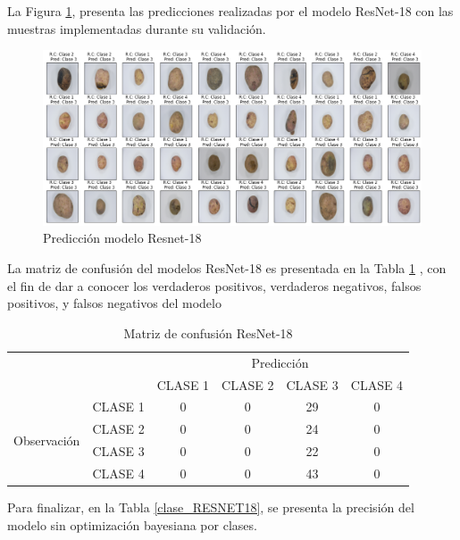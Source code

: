 \newpage
La Figura \ref{fig:pre_RESNET18}, presenta las predicciones realizadas por el modelo ResNet-18 con las muestras implementadas durante su validación.

\begin{figure}[ht]
	\centering
	\includegraphics[scale=0.4]{Figs/111.png}
	\caption{Predicción modelo Resnet-18}
	\label{fig:pre_RESNET18}
\end{figure}

La matriz de confusión del modelos ResNet-18 es presentada en la Tabla \ref*{MC_RESNET18} , con el fin de dar a conocer los verdaderos positivos, verdaderos negativos, falsos positivos, y falsos negativos del modelo

\begin{table}[htbp]
	\centering
	\begin{tabular}{|c|l|c|c|c|c|}
		\hline
		\multicolumn{2}{|c|}{\multirow{2}[4]{*}{}} & \multicolumn{4}{c|}{Predicción} \bigstrut\\
		\cline{3-6}    \multicolumn{2}{|c|}{} & CLASE 1 & CLASE 2 & CLASE 3 & CLASE 4 \bigstrut\\
		\hline
		\multirow{4}[8]{*}{\begin{sideways}Observación\end{sideways}} & CLASE 1 & 0     & 0     & 29    & 0 \bigstrut\\
		\cline{2-6}          & CLASE 2 & 0     & 0     & 24    & 0 \bigstrut\\
		\cline{2-6}          & CLASE 3 & 0     & 0     & 22    & 0 \bigstrut\\
		\cline{2-6}          & CLASE 4 & 0     & 0     & 43    & 0 \bigstrut\\
		\hline
	\end{tabular}%
	\caption{Matriz de confusión ResNet-18}
	\label{MC_RESNET18}
\end{table}%

Para finalizar, en la Tabla \ref*{clase_RESNET18}, se presenta la precisión del modelo sin optimización bayesiana por clases.

